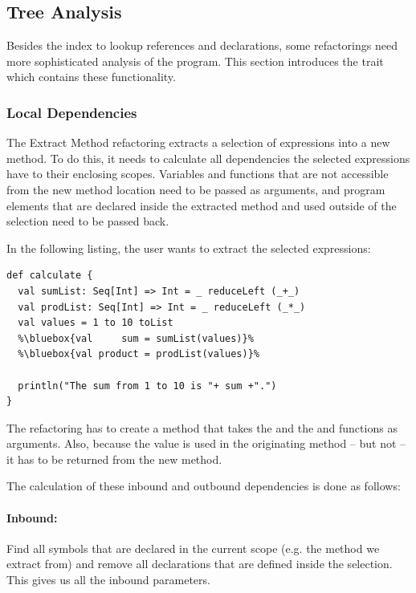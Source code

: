 \subsection{Tree Analysis}

Besides the index to lookup references and declarations, some refactorings need more sophisticated analysis of the program. This section introduces the  trait which contains these functionality.

\subsubsection{Local Dependencies}

The Extract Method refactoring extracts a selection of expressions into a new method. To do this, it needs to calculate all dependencies the selected expressions have to their enclosing scopes. Variables and functions that are not accessible from the new method location need to be passed as arguments, and program elements that are declared inside the extracted method and used outside of the selection need to be passed back.

In the following listing, the user wants to extract the selected expressions:

\begin{lstlisting}
def calculate {
  val sumList: Seq[Int] => Int = _ reduceLeft (_+_)
  val prodList: Seq[Int] => Int = _ reduceLeft (_*_)
  val values = 1 to 10 toList
  %\bluebox{val     sum = sumList(values)}%
  %\bluebox{val product = prodList(values)}%

  println("The sum from 1 to 10 is "+ sum +".")
}
\end{lstlisting}

The refactoring has to create a method that takes the  and the  and  functions as arguments. Also, because the  value is used in the originating method -- but not  -- it has to be returned from the new method.

The calculation of these inbound and outbound dependencies is done as follows:

\paragraph{Inbound:} Find all symbols that are declared in the current scope (e.g. the method we extract from) and remove all declarations that are defined inside the selection. This gives us all the inbound parameters.	


